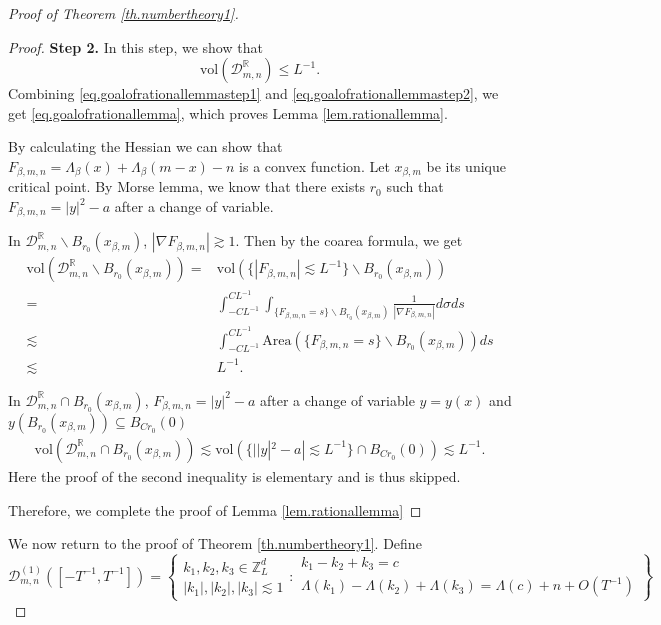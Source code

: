 \begin{proof}[Proof of Theorem \ref{th.numbertheory1}]
\begin{proof}
\textbf{Step 2.} In this step, we show that 
\begin{equation}\label{eq.goalofrationallemmastep2}
    \text{vol}(\mathcal{D}^{\mathbb{R}}_{m,n})\le L^{-1}.
\end{equation}
Combining \eqref{eq.goalofrationallemmastep1} and \eqref{eq.goalofrationallemmastep2}, we get
\eqref{eq.goalofrationallemma}, which proves Lemma \ref{lem.rationallemma}.


By calculating the Hessian we can show that $F_{\beta,m,n}=\Lambda_{\beta}(x)+\Lambda_{\beta}(m-x)-n$ is a convex function. Let $x_{\beta, m}$ be its unique critical point. By Morse lemma, we know that there exists $r_0$ such that $F_{\beta,m,n}=|y|^2-a$ after a change of variable.

In $\mathcal{D}^{\mathbb{R}}_{m,n}\backslash B_{r_0}(x_{\beta, m})$, $|\nabla F_{\beta,m,n}|\gtrsim 1$. Then by the coarea formula, we get
\begin{equation}
\begin{split}
    \text{vol}(\mathcal{D}^{\mathbb{R}}_{m,n}\backslash B_{r_0}(x_{\beta, m})) =&  \text{vol}(\{|F_{\beta,m,n}|\lesssim L^{-1}\}\backslash B_{r_0}(x_{\beta, m}))
    \\
    =& \int^{CL^{-1}}_{-CL^{-1}} \int_{\{F_{\beta,m,n}=s\}\backslash B_{r_0}(x_{\beta, m})}\frac{1}{|\nabla F_{\beta,m,n}|}d\sigma ds
    \\
    \lesssim& \int^{CL^{-1}}_{-CL^{-1}} \text{Area}(\{F_{\beta,m,n}=s\}\backslash B_{r_0}(x_{\beta, m})) ds
    \\
    \lesssim& L^{-1}.
\end{split}
\end{equation}

In $\mathcal{D}^{\mathbb{R}}_{m,n}\cap  B_{r_0}(x_{\beta, m})$, $F_{\beta,m,n}=|y|^2-a$ after a change of variable $y=y(x)$ and $y(B_{r_0}(x_{\beta, m}))\subseteq B_{Cr_0}(0)$ 
\begin{equation}
\begin{split}
    \text{vol}(\mathcal{D}^{\mathbb{R}}_{m,n}\cap B_{r_0}(x_{\beta, m})) \lesssim \text{vol}(\{||y|^2-a|\lesssim L^{-1}\}\cap B_{Cr_0}(0))\lesssim L^{-1}.
\end{split}
\end{equation}
Here the proof of the second inequality is elementary and is thus skipped. 

Therefore, we complete the proof of Lemma \ref{lem.rationallemma}
\end{proof}

We now return to the proof of Theorem \ref{th.numbertheory1}. Define 
\begin{equation}
    \mathcal{D}^{(1)}_{m,n}([-T^{-1},T^{-1} ])=\left\{\begin{matrix}
k_1,k_2,k_3\in\mathbb{Z}_L^d \\
|k_1|,|k_2|,|k_3|\lesssim 1
\end{matrix}
:
\begin{matrix}
k_1-k_2+k_3=c \\
\Lambda(k_1)-\Lambda(k_2)+\Lambda(k_3)=\Lambda(c)+n+O(T^{-1})
\end{matrix}
\right\}
\end{equation}


\end{proof}
